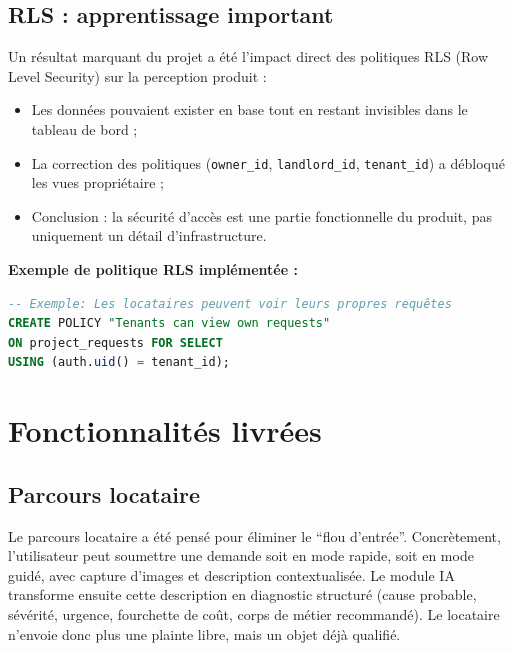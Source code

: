\documentclass[11pt,a4paper]{article}
\begin{document}

\subsection{RLS : apprentissage important}

Un résultat marquant du projet a été l'impact direct des politiques RLS (Row Level Security) sur la perception produit :

\begin{itemize}[leftmargin=1.4em]
  \item Les données pouvaient exister en base tout en restant invisibles dans le tableau de bord ;
  \item La correction des politiques (\texttt{owner\_id}, \texttt{landlord\_id}, \texttt{tenant\_id}) a débloqué les vues propriétaire ;
  \item Conclusion : la sécurité d'accès est une partie fonctionnelle du produit, pas uniquement un détail d'infrastructure.
\end{itemize}

\textbf{Exemple de politique RLS implémentée :}
\begin{lstlisting}[language=SQL, caption=Exemple de politique RLS pour l'accès aux requêtes]
-- Exemple: Les locataires peuvent voir leurs propres requêtes
CREATE POLICY "Tenants can view own requests" 
ON project_requests FOR SELECT 
USING (auth.uid() = tenant_id);
\end{lstlisting}

\section{Fonctionnalités livrées}

\subsection{Parcours locataire}

Le parcours locataire a été pensé pour éliminer le ``flou d'entrée''. Concrètement, l'utilisateur peut soumettre une demande soit en mode rapide, soit en mode guidé, avec capture d'images et description contextualisée. Le module IA transforme ensuite cette description en diagnostic structuré (cause probable, sévérité, urgence, fourchette de coût, corps de métier recommandé). Le locataire n'envoie donc plus une plainte libre, mais un objet déjà qualifié.
\end{document}
